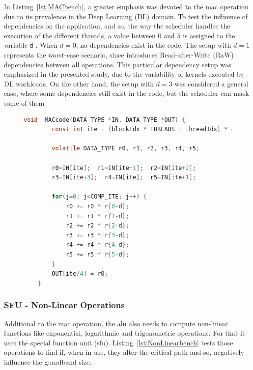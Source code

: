 In Listing~\ref{lst:MACbench}, a greater emphasis was devoted to the \acrshort{mac} operation due to its prevalence in the Deep Learning (DL) domain. To test the influence of dependencies on the application, and so, the way the scheduler handles the execution of the different threads, a value between $0$ and $5$ is assigned to the variable \texttt{d} . When $d=0$, no dependencies exist in the code. The setup with $d=1$ represents the worst-case scenario, since introduces Read-after-Write (RaW) dependencies between all operations. This particular dependency setup was emphasized in the presented study, due to the variability of kernels executed by DL workloads. On the other hand, the setup with $d=3$ was considered a general case, where some dependencies still exist in the code, but the scheduler can mask some of them



\begin{figure}[htpb]
    \begin{lstlisting}[language=C, caption=MAC Benchmark Code, label=lst:MACbench, basicstyle=\footnotesize\ttfamily, abovecaptionskip=0pt, captionpos=b]
    void  MACcode(DATA_TYPE *IN, DATA_TYPE *OUT) {
        const int ite = (blockIdx * THREADS + threadIdx) * 4;
        
        volatile DATA_TYPE r0, r1, r2, r3, r4, r5;
        
        r0=IN[ite];  r1=IN[ite+1];  r2=IN[ite+2]; 
        r3=IN[ite+3];  r4=IN[ite];  r5=IN[ite+1];
        
        for(j=0; j<COMP_ITE; j++) {
            r0 += r0 * r{0-d};
            r1 += r1 * r{1-d}; 
            r2 += r2 * r{2-d};
            r3 += r3 * r{3-d}; 
            r4 += r4 * r{4-d};
            r5 += r5 * r{5-d};
        }
        OUT[ite/4] = r0;
    }
    \end{lstlisting}
\end{figure}


\subsubsection{SFU - Non-Linear Operations}
    
Additional to the \acrshort{mac} operation, the \acrshort{alu} also needs to compute non-linear functions like exponential, logarithmic and trigonometric operations. For that it uses the special function unit (\acrshort{sfu}). Listing~\ref{lst:NonLinearbench} tests those operations to find if, when in use, they alter the critical path and so, negatively influence the guardband size.
    
